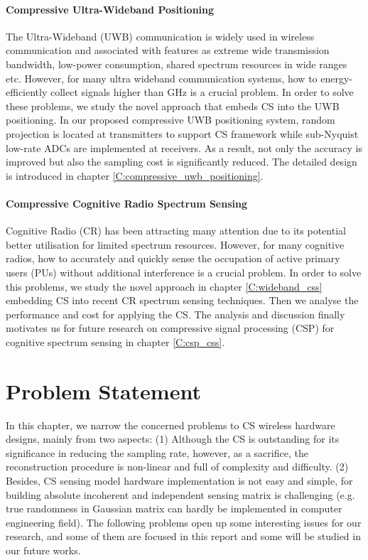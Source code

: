\paragraph{Compressive Ultra-Wideband Positioning} 
The Ultra-Wideband (UWB) communication is widely used in wireless communication and associated with features as extreme wide transmission bandwidth, low-power consumption, shared spectrum resources in wide ranges etc. However, for many ultra wideband communication systems, how to energy-efficiently collect signals higher than GHz is a crucial problem. In order to solve these problems, we study the novel approach that embeds CS into the UWB positioning. In our proposed compressive UWB positioning system, random projection is located at transmitters to support CS framework while sub-Nyquist low-rate ADCs are implemented at receivers. As a result, not only the accuracy is improved but also the sampling cost is significantly reduced. The detailed design is introduced in chapter \ref{C:compressive_uwb_positioning}.

\paragraph{Compressive Cognitive Radio Spectrum Sensing}
Cognitive Radio (CR) has been attracting many attention due to its potential better utilisation for limited spectrum resources. However, for many cognitive radios, how to accurately and quickly sense the occupation of active primary users (PUs) without additional interference is a crucial problem. In order to solve this problems, we study the novel approach in chapter \ref{C:wideband_css} embedding CS into recent CR spectrum sensing techniques. Then we analyse the performance and cost for applying the CS. The analysis and discussion finally motivates us for future research on compressive signal processing (CSP) for cognitive spectrum sensing in chapter \ref{C:csp_css}.

\section{Problem Statement}\label{sct:problem_state}
\indent \indent In this chapter, we narrow the concerned problems to CS wireless hardware designs, mainly from two aspects: (1) Although the CS is outstanding for its significance in reducing the sampling rate, however, as a sacrifice, the reconstruction procedure is non-linear and full of complexity and difficulty. (2) Besides, CS sensing model hardware implementation is not easy and simple, for building absolute incoherent and independent sensing matrix is challenging (e.g. true randomness in Gaussian matrix can hardly be implemented in computer engineering field). The following problems open up some interesting issues for our research, and  some of them are focused in this report and some will be studied in our future works. 

